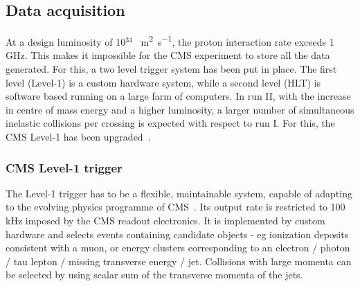   
  
  
  
\subsection{Data acquisition}
\label{sec:DAQ}
At a design luminosity of 10$^{34}$ \si{ \per \square \meter \per \second}, the proton interaction rate exceeds 1 \si{ \giga \hertz}. This makes it impossible for the CMS experiment to store all the data generated. For this, a two level trigger system has been put in place. The first level (Level-1) is a custom hardware system, while a second level (HLT) is software based running on a large farm of computers. 
In run II, with the increase in centre of mass energy and a higher luminosity, a larger number of simultaneous inelastic collisions per crossing is expected with respect to run I. For this, the CMS Level-1 has been upgraded~\cite{1748-0221-12-03-C03021}. 

\subsubsection*{CMS Level-1 trigger}
The Level-1 trigger has to be a flexible, maintainable system, capable of adapting to the evolving physics programme of CMS~\cite{Khachatryan:2016bia}. Its output rate is restricted to 100 \si{ \kilo \hertz} imposed by the CMS readout electronics. It is implemented by custom hardware and selects events containing candidate objects - eg ionization deposits consistent with a muon, or energy clusters corresponding to an electron / photon / tau lepton / missing transverse energy / jet. Collisions with large momenta can be selected by using scalar sum of the transverse momenta of the jets. 

